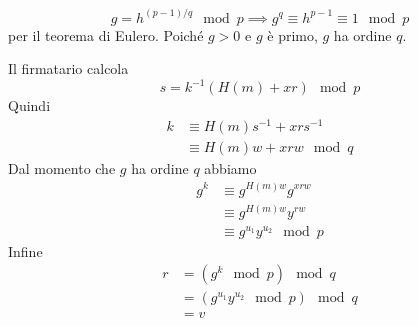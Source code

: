 \documentclass[14pt]{extarticle}
\begin{document}
    \begin{equation*}
        g = h^{(p-1)/q} \mod p
        \implies
        g^q \equiv h^{p-1} \equiv 1 \mod p
    \end{equation*}
    per il teorema di Eulero.
    Poiché $g > 0$ e $g$ è primo, $g$ ha ordine $q$.

    \bigskip
    Il firmatario calcola
    \begin{equation*}
        s = k^{-1}(H(m) + xr) \mod p
    \end{equation*}
    Quindi
    \begin{align*}
        k &\equiv H(m)s^{-1} + xrs^{-1}\\
          &\equiv H(m)w + xrw \mod q
    \end{align*}
    Dal momento che $g$ ha ordine $q$ abbiamo
    \begin{align*}
        g^k &\equiv g^{H(m)w}g^{xrw}\\
            &\equiv g^{H(m)w}y^{rw}\\
            &\equiv g^{u_1}y^{u_2} \mod p
    \end{align*}
    Infine
    \begin{align*}
        r &= (g^k \mod p) \mod q\\
          &= (g^{u_1}y^{u_2} \mod p) \mod q\\
          &= v
    \end{align*}
\end{document}
